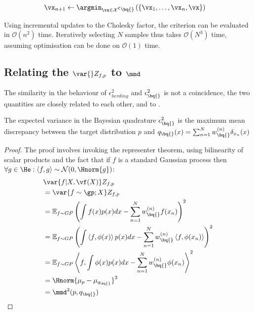 \begin{align}
\vx_{n+1} &\leftarrow \argmin_{\vx \in \mathcal{X}} \epsilon_{\bq{}}\left(\{\vx_1,\ldots,\vx_{n},\vx\}\right)
\end{align}

Using incremental updates to the Cholesky factor, the criterion can be evaluated in $\mathcal{O}(n^2)$ time. Iteratively selecting $N$ samples thus takes $\mathcal{O}(N^3)$ time, assuming optimisation can be done on $\mathcal{O}(1)$ time.

\subsection{Relating the $\var{} Z_{f,p}$ to $\mmd$}

The similarity in the behaviour of $\epsilon^{2}_{herding}$ and $\epsilon^{2}_{\bq{}}$ is not a coincidence, the two quantities are closely related to each other, and to \mmd.

\begin{proposition} The expected variance in the Bayesian quadrature $\epsilon^{2}_{\bq{}}$  is the maximum mean discrepancy between the target distribution $p$ and $q_{\bq{}}(x) = \sum_{n=1}^{N}w^{(n)}_{\bq{}}\delta_{x_n}(x)$
\end{proposition}

\begin{proof}
The proof involves invoking the representer theorem, using bilinearity of scalar products and the fact that if $f$ is a standard Gaussian process then $\forall g\in\He: \left\langle f,g\right\rangle \sim \mathcal{N}(0,\Hnorm{g})$:
\begin{align}
&\var{f\vert X,\vf(X)} Z_{f,p}\\
	&= \var{f\sim \gp; X} Z_{f,p}\\
	&= \mathbb{E}_{f\sim GP} \left( \int f(x) p(x) dx - \sum_{n=1}^{N}w^{(n)}_{\bq{}} f(x_n)\right)^2\\
	&= \mathbb{E}_{f\sim GP} \left( \int \left\langle f, \phi (x)\right\rangle p(x) dx - \sum_{n=1}^{N}w^{(n)}_{\bq{}} \left\langle f, \phi (x_n)\right\rangle\right)^2\\
	&= \mathbb{E}_{f\sim GP} \left\langle f ,  \int\phi(x) p(x) dx - \sum_{n=1}^{N}w^{(n)}_{\bq{}}\phi(x_n)\right\rangle^2\\
	&= \Hnorm{\mu_p - \mu_{q_{\bq{}}}}^2\\
	&= \mmd^2(p,q_{\bq{}})
\end{align}
\end{proof}

